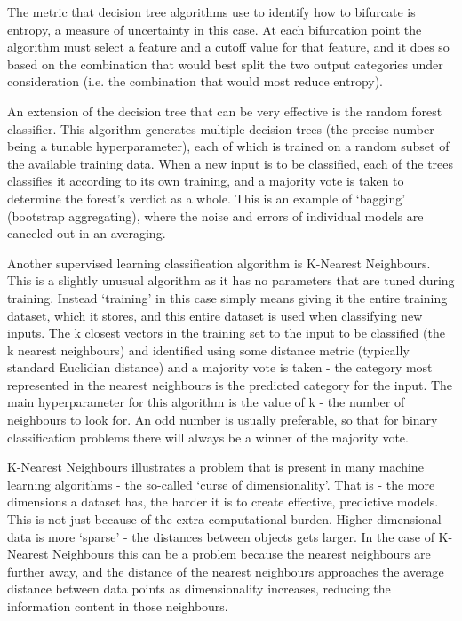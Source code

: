 The metric that decision tree algorithms use to identify how to bifurcate is entropy, a measure of uncertainty in this case. At each bifurcation point the algorithm must select a feature and a cutoff value for that feature, and it does so based on the combination that would best split the two output categories under consideration (i.e. the combination that would most reduce entropy).

An extension of the decision tree that can be very effective is the random forest classifier. This algorithm generates multiple decision trees (the precise number being a tunable hyperparameter), each of which is trained on a random subset of the available training data. When a new input is to be classified, each of the trees classifies it according to its own training, and a majority vote is taken to determine the forest's verdict as a whole. This is an example of `bagging' (bootstrap aggregating), where the noise and errors of individual models are canceled out in an averaging.

Another supervised learning classification algorithm is K-Nearest Neighbours. This is a slightly unusual algorithm as it has no parameters that are tuned during training. Instead `training' in this case simply means giving it the entire training dataset, which it stores, and this entire dataset is used when classifying new inputs. The k closest vectors in the training set to the input to be classified (the k nearest neighbours) and identified using some distance metric (typically standard Euclidian distance) and a majority vote is taken - the category most represented in the nearest neighbours is the predicted category for the input. The main hyperparameter for this algorithm is the value of k - the number of neighbours to look for. An odd number is usually preferable, so that for binary classification problems there will always be a winner of the majority vote.

K-Nearest Neighbours illustrates a problem that is present in many machine learning algorithms - the so-called `curse of dimensionality'. That is - the more dimensions a dataset has, the harder it is to create effective, predictive models. This is not just because of the extra computational burden. Higher dimensional data is more `sparse' - the distances between objects gets larger. In the case of K-Nearest Neighbours this can be a problem because the nearest neighbours are further away, and the distance of the nearest neighbours approaches the average distance between data points as dimensionality increases, reducing the information content in those neighbours.

